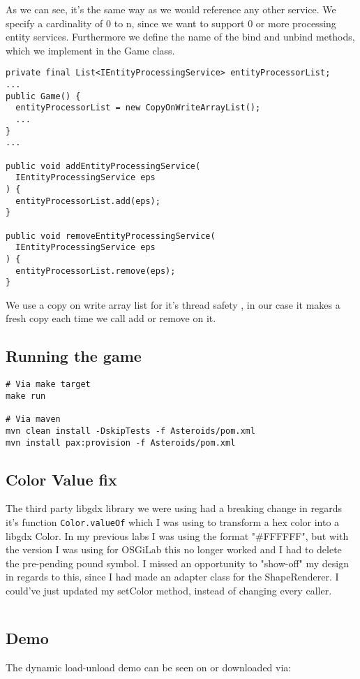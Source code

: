 As we can see, it's the same way as we would reference any other service. We
specify a cardinality of 0 to n, since we want to support 0 or more processing
entity services. Furthermore we define the name of the bind and unbind methods, which we
implement in the Game class.

\begin{verbatim}
private final List<IEntityProcessingService> entityProcessorList;
...
public Game() {
  entityProcessorList = new CopyOnWriteArrayList();
  ...
}
...

public void addEntityProcessingService(
  IEntityProcessingService eps
) {
  entityProcessorList.add(eps);
}

public void removeEntityProcessingService(
  IEntityProcessingService eps
) {
  entityProcessorList.remove(eps);
}
\end{verbatim}

We use a copy on write array list for it's thread safety
\cite{java-copy-on-write}, in our case it makes a fresh copy each time we call
add or remove on it.

\subsection{Running the game}
\begin{verbatim}
# Via make target
make run

# Via maven
mvn clean install -DskipTests -f Asteroids/pom.xml
mvn install pax:provision -f Asteroids/pom.xml
\end{verbatim}

\subsection{Color Value fix}
The third party libgdx library we were using had a breaking change in regards
it's function \texttt{Color.valueOf} which I was using to transform a hex color
into a libgdx Color. In my previous labs I was using the format "\#FFFFFF", but
with the version I was using for OSGiLab this no longer worked and I had to
delete the pre-pending pound symbol.
I missed an opportunity to "show-off" my design in regards to this, since I had
made an adapter class for the ShapeRenderer. I could've just updated my setColor
method, instead of changing every caller.

\inputminted{java}{code/color-value-fix.java}


\subsection{Demo}
The dynamic load-unload demo can be seen on
 or downloaded via:
